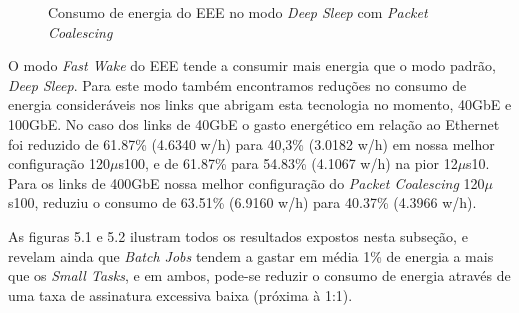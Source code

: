 \begin{figure}[!htb]
    \hfill
    
    \caption{\centering Consumo de energia do EEE no modo \emph{Deep Sleep} com \emph{Packet Coalescing}}
\end{figure}

O modo \emph{Fast Wake} do EEE tende a consumir mais energia que o modo padrão, \emph{Deep Sleep}.  Para este modo também encontramos reduções no consumo de energia consideráveis nos links que abrigam esta tecnologia no momento, 40GbE e 100GbE.  No caso dos links de 40GbE o gasto energético em relação ao Ethernet foi reduzido de 61.87\% (4.6340 w/h) para 40,3\% (3.0182 w/h) em nossa melhor configuração 120$\mu$s100, e de 61.87\% para 54.83\% (4.1067 w/h) na pior 12$\mu$s10. Para os links de 400GbE nossa melhor configuração do \emph{Packet Coalescing} 120$\mu$s100, reduziu o consumo de  63.51\% (6.9160 w/h) para 40.37\% (4.3966 w/h).

As figuras 5.1 e 5.2 ilustram todos os resultados expostos nesta subseção, e revelam ainda que \emph{Batch Jobs} tendem a gastar em média 1\% de energia a mais que os \emph{Small Tasks}, e em ambos, pode-se reduzir o consumo de energia através de uma taxa de assinatura excessiva baixa (próxima à 1:1).

